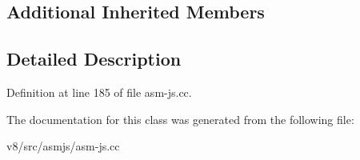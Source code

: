 \subsection*{Additional Inherited Members}


\subsection{Detailed Description}


Definition at line 185 of file asm-\/js.\+cc.



The documentation for this class was generated from the following file\+:\begin{DoxyCompactItemize}
\item 
v8/src/asmjs/asm-\/js.\+cc\end{DoxyCompactItemize}
